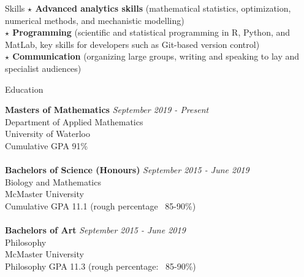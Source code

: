 \documentclass{resume} %
\begin{document}
\begin{rSection}{Skills}
{\bf $\star$ Advanced analytics skills} (mathematical statistics, optimization, numerical methods, and mechanistic modelling)\\ 
{\bf $\star$ Programming} (scientific and statistical programming in R, Python, and MatLab, key skills for developers such as Git-based version control)\\
{\bf $\star$ Communication} (organizing large groups, writing and speaking to lay and specialist audiences)
\end{rSection}


\begin{rSection}{Education}

{\bf Masters of Mathematics} \hfill {\em September 2019 - Present} 
\\ Department of Applied Mathematics
\\ University of Waterloo
\\ Cumulative GPA 91\%\\
\\{\bf Bachelors of Science (Honours)} \hfill {\em September 2015 - June 2019} 
\\ Biology and Mathematics
\\ McMaster University
\\ Cumulative GPA 11.1 (rough percentage ~85-90\%)\\
\\{\bf Bachelors of Art} \hfill {\em September 2015 - June 2019}
\\ Philosophy
\\ McMaster University
\\ Philosophy GPA 11.3 (rough percentage: ~85-90\%)

\end{rSection}
\end{document}
